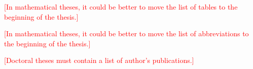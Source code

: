 \documentclass[12pt,a4paper]{report}
\def\XXX#1{\par\smallskip\noindent \textcolor{red}{[#1]}}
\begin{document}



\tableofcontents



















\listoffigures

\listoftables
\XXX{In mathematical theses, it could be better to move the list of tables to the beginning of the thesis.}

\XXX{In mathematical theses, it could be better to move the list of abbreviations to the beginning of the thesis.}

\XXX{Doctoral theses must contain a list of author's publications.}

\appendix
\end{document}

